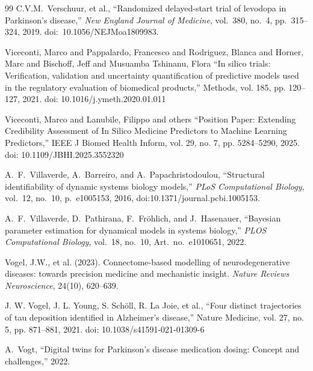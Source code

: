 \begin{thebibliography}{99}
C.V.M.~Verschuur, et al., ``Randomized delayed-start trial of levodopa in Parkinson's disease,'' \textit{New England Journal of Medicine}, vol.~380, no.~4, pp.~315--324, 2019. doi:~10.1056/NEJMoa1809983.


 Viceconti, Marco and Pappalardo, Francesco and Rodriguez, Blanca and Horner, Marc and Bischoff, Jeff and Musuamba Tshinanu, Flora ``In silico trials: Verification, validation and uncertainty quantification of predictive models used in the regulatory evaluation of biomedical products,'' Methods, vol. 185, pp. 120--127, 2021. doi: 10.1016/j.ymeth.2020.01.011

 Viceconti, Marco and Lanubile, Filippo and others ``Position Paper: Extending Credibility Assessment of In Silico Medicine Predictors to Machine Learning Predictors,'' IEEE J Biomed Health Inform, vol. 29, no. 7, pp. 5284--5290, 2025. doi: 10.1109/JBHI.2025.3552320

A.~F.~Villaverde, A.~Barreiro, and A.~Papachristodoulou, ``Structural identifiability of dynamic systems biology models,'' \textit{PLoS Computational Biology}, vol.~12, no.~10, p.~e1005153, 2016, doi:10.1371/journal.pcbi.1005153.

A.~F.~Villaverde, D.~Pathirana, F.~Fr{\"o}hlich, and J.~Hasenauer, ``Bayesian parameter estimation for dynamical models in systems biology,'' \textit{PLOS Computational Biology}, vol.~18, no.~10, Art.\ no.~e1010651, 2022.

Vogel, J.W., et al. (2023).
\newblock Connectome-based modelling of neurodegenerative diseases: towards precision medicine and mechanistic insight.
\newblock \emph{Nature Reviews Neuroscience}, 24(10), 620--639.

 J. W. Vogel, J. L. Young, S. Sch\"oll, R. La Joie, et al., ``Four distinct trajectories of tau deposition identified in Alzheimer's disease,'' Nature Medicine, vol. 27, no. 5, pp. 871--881, 2021. doi: 10.1038/s41591-021-01309-6

A.~Vogt, ``Digital twins for Parkinson's disease medication dosing: Concept and challenges,'' 2022.


\end{thebibliography}
